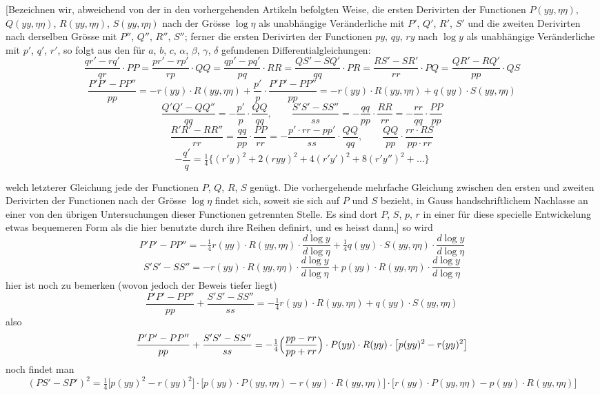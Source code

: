 \documentclass[10pt,a4paper]{article}
\begin{document}
[Bezeichnen wir, abweichend von der in den vorhergehenden Artikeln befolgten Weise, die ersten Derivirten der Functionen $P(yy,\eta\eta)$, $Q(yy,\eta\eta)$, $R(yy,\eta\eta)$,
$S(yy,\eta\eta)$ nach der Grösse $\log\eta$ als unabhängige Veränderliche mit $P'$, $Q'$, $R'$, $S'$
und die zweiten Derivirten nach derselben Grösse mit $P''$, $Q''$, $R''$, $S''$; ferner die
ersten Derivirten der Functionen $py$, $qy$, $ry$ nach $\log y$ als unabhängige Veränderliche mit $p'$, $q'$, $r'$, so folgt aus den für $a$, $b$, $c$, $\alpha$, $\beta$, $\gamma$, $\delta$ gefundenen Differentialgleichungen:
\[
\frac{qr'-rq'}{qr}\cdot PP = \frac{pr'-rp'}{rp}\cdot QQ = \frac{qp'-pq'}{pq}\cdot RR = \frac{QS'-SQ'}{qq}\cdot PR = \frac{RS'-SR'}{rr}\cdot PQ = \frac{QR'-RQ'}{pp}\cdot QS
\]
\[
\frac{P'P'-PP''}{pp} = -r(yy)\cdot R(yy,\eta\eta) + \frac{p'}{p}\cdot\frac{P'P'-PP''}{pp} = -r(yy)\cdot R(yy,\eta\eta) + q(yy)\cdot S(yy,\eta\eta)
\]
\[
\frac{Q'Q'-QQ''}{qq} = -\frac{p'}{p}\cdot\frac{QQ}{qq}, \qquad
\frac{S'S'-SS''}{ss} = -\frac{qq}{pp}\cdot\frac{RR}{rr} = -\frac{rr}{qq}\cdot\frac{PP}{pp}
\]
\[
\frac{R'R'-RR''}{rr} = \frac{qq}{pp}\cdot\frac{PP}{rr} = -\frac{p'\cdot rr-pp'}{ss}\cdot\frac{QQ}{qq}, \qquad
\frac{QQ}{pp}\cdot\frac{rr\cdot RS}{pp\cdot rr}
\]
\[
-\frac{q'}{q} = \tfrac14\bigl\{(r'y)^2 + 2(ryy)^2 + 4(r'y')^2 + 8(r'y'')^2 + \ldots\bigr\}
\]

welch letzterer Gleichung jede der Functionen $P$, $Q$, $R$, $S$ genügt. Die vorhergehende mehrfache Gleichung zwischen den ersten und zweiten Derivirten der
Functionen nach der Grösse $\log\eta$ findet sich, soweit sie sich auf $P$ und $S$ bezieht, in Gauss handschriftlichem Nachlasse an einer von den übrigen Untersuchungen dieser Functionen getrennten Stelle. Es sind dort $P$, $S$, $p$, $r$ in einer
für diese specielle Entwickelung etwas bequemeren Form als die hier benutzte
durch ihre Reihen definirt, und es heisst dann,] so wird
\[
P'P'-PP'' = -\tfrac14 r(yy)\cdot R(yy,\eta\eta)\cdot\frac{d\log y}{d\log\eta} + \tfrac14 q(yy)\cdot S(yy,\eta\eta)\cdot\frac{d\log y}{d\log\eta}
\]
\[
S'S'-SS'' = -r(yy)\cdot R(yy,\eta\eta)\cdot\frac{d\log y}{d\log\eta} + p(yy)\cdot R(yy,\eta\eta)\cdot\frac{d\log y}{d\log\eta}
\]
hier ist noch zu bemerken (wovon jedoch der Beweis tiefer liegt)
\[
\frac{P'P'-PP''}{pp} + \frac{S'S'-SS''}{ss} = -\tfrac14 r(yy)\cdot R(yy,\eta\eta) + q(yy)\cdot S(yy,\eta\eta)
\]
also
\[
\frac{P'P'-PP''}{pp} + \frac{S'S'-SS''}{ss} = -\tfrac14\Bigl(\frac{pp-rr}{pp+rr}\Bigr)\cdot P(yy)\cdot R(yy) \cdot \bigl[p(yy)^2-r(yy)^2\bigr]
\]
noch findet man
\[
(PS'-SP')^2 = \tfrac14\bigl[p(yy)^2-r(yy)^2\bigr]\cdot\bigl[p(yy)\cdot P(yy,\eta\eta)-r(yy)\cdot R(yy,\eta\eta)\bigr] \cdot \bigl[r(yy)\cdot P(yy,\eta\eta)-p(yy)\cdot R(yy,\eta\eta)\bigr]
\]
\end{document}
